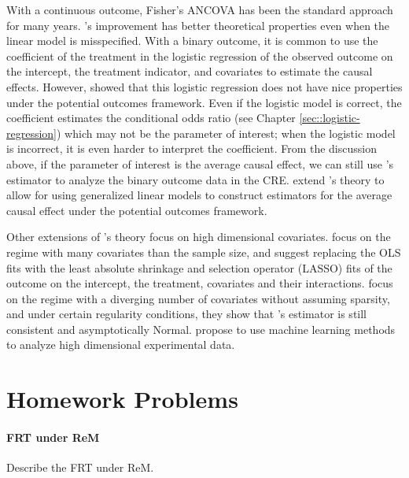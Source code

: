 With a continuous outcome, Fisher's ANCOVA has been the standard approach for many years.  \citet{lin2013}'s improvement has better theoretical properties even when the linear model is misspecified. With a binary outcome, it is common to use the coefficient of the treatment in the logistic regression of the observed outcome on the intercept, the treatment indicator, and covariates to estimate the causal effects. However, \citet{freedman2008randomization} showed that this logistic regression does not have nice properties under the potential outcomes framework. Even if the logistic model is correct, the coefficient estimates the conditional odds ratio (see Chapter \ref{sec::logistic-regression}) which may not be the parameter of interest; when the logistic model is incorrect, it is even harder to interpret the coefficient. From the discussion above, if the parameter of interest is the average causal effect, we can still use \citet{lin2013}'s estimator to analyze the binary outcome data in the CRE. \cite{guo2020generalized} extend  \citet{lin2013}'s theory to allow for using generalized linear models to construct estimators for the average causal effect under the potential outcomes framework.  


Other extensions of \citet{lin2013}'s theory focus on high dimensional covariates. \citet{bloniarz2015lasso} focus on the regime with many covariates than the sample size, and suggest replacing the OLS fits with the least absolute shrinkage and selection operator (LASSO) fits \citep{tibshirani1996regression} of the outcome on the intercept, the treatment, covariates and their interactions. \citet{lei2018regression} focus on the regime with a diverging number of covariates without assuming sparsity, and under certain regularity conditions, they show that \citet{lin2013}'s estimator is still consistent and asymptotically Normal. \citet{wager2016high} propose to use machine learning methods to analyze high dimensional experimental data. 



\section{Homework Problems}

\paragraph{FRT under ReM}\label{hw::FRT-under-REM}

Describe the FRT under ReM.


